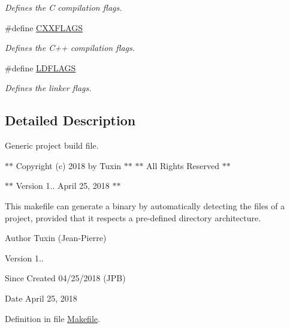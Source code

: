 \begin{DoxyCompactItemize}
\begin{DoxyCompactList}\small\item\em Defines the C compilation flags. \end{DoxyCompactList}\item 
\hypertarget{group___automatic___variables_gafdfbf6a8a87928f2448e0db6d441bd90}{\#define \hyperlink{group___automatic___variables_gafdfbf6a8a87928f2448e0db6d441bd90}{C\+X\+X\+F\+L\+A\+G\+S}}\label{group___automatic___variables_gafdfbf6a8a87928f2448e0db6d441bd90}

\begin{DoxyCompactList}\small\item\em Defines the C++ compilation flags. \end{DoxyCompactList}\item 
\hypertarget{group___automatic___variables_ga2dd4b41234e5a632ac37afce55156d7d}{\#define \hyperlink{group___automatic___variables_ga2dd4b41234e5a632ac37afce55156d7d}{L\+D\+F\+L\+A\+G\+S}}\label{group___automatic___variables_ga2dd4b41234e5a632ac37afce55156d7d}

\begin{DoxyCompactList}\small\item\em Defines the linker flags. \end{DoxyCompactList}\end{DoxyCompactItemize}


\subsection{Detailed Description}
Generic project build file. 



 

 $\ast$$\ast$ Copyright (c) 2018 by Tuxin $\ast$$\ast$ $\ast$$\ast$ All Rights Reserved $\ast$$\ast$ 

 $\ast$$\ast$ Version 1.. April 25, 2018 $\ast$$\ast$ 

 

 

 \begin{DoxyVerb}         This makefile can generate a binary by automatically detecting
         the files of a project, provided that it respects a pre-defined
         directory architecture.
\end{DoxyVerb}


\begin{DoxyAuthor}{Author}
Tuxin (Jean-\/\+Pierre) 
\end{DoxyAuthor}
\begin{DoxyVersion}{Version}
1.. 
\end{DoxyVersion}
\begin{DoxySince}{Since}
Created 04/25/2018 (J\+P\+B) 
\end{DoxySince}
\begin{DoxyDate}{Date}
April 25, 2018
\end{DoxyDate}




Definition in file \hyperlink{_makefile_source}{Makefile}.

